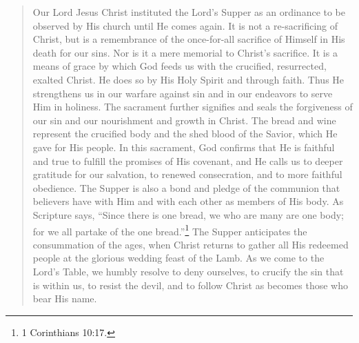 \documentclass[
]{book}
\begin{document}
\begin{enumerate}
  \begin{quote}
  Our Lord Jesus Christ instituted the Lord's Supper as an ordinance to be observed by His church until He comes again. It is not a re-sacrificing of Christ, but is a remembrance of the once-for-all sacrifice of Himself in His death for our sins. Nor is it a mere memorial to Christ's sacrifice. It is a means of grace by which God feeds us with the crucified, resurrected, exalted Christ. He does so by His Holy Spirit and through faith. Thus He strengthens us in our warfare against sin and in our endeavors to serve Him in holiness. The sacrament further signifies and seals the forgiveness of our sin and our nourishment and growth in Christ. The bread and wine represent the crucified body and the shed blood of the Savior, which He gave for His people. In this sacrament, God confirms that He is faithful and true to fulfill the promises of His covenant, and He calls us to deeper gratitude for our salvation, to renewed consecration, and to more faithful obedience. The Supper is also a bond and pledge of the communion that believers have with Him and with each other as members of His body. As Scripture says, ``Since there is one bread, we who are many are one body; for we all partake of the one bread.''\footnote{1 Corinthians 10:17.} The Supper anticipates the consummation of the ages, when Christ returns to gather all His redeemed people at the glorious wedding feast of the Lamb. As we come to the Lord's Table, we humbly resolve to deny ourselves, to crucify the sin that is within us, to resist the devil, and to follow Christ as becomes those who bear His name.
  \end{quote}
\end{enumerate}
\end{document}
